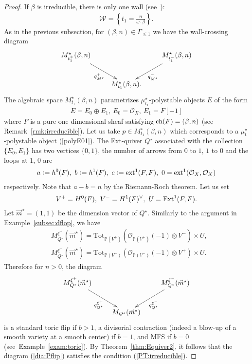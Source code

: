 \documentclass[11pt]{amsart}
\theoremstyle{plain}
\theoremstyle{definition}
\theoremstyle{remark}
\newcommand{\oO}{\mathcal{O}}
\newcommand{\wW}{\mathcal{W}}
\newcommand{\ch}{\mathop{\rm ch}\nolimits}
\newcommand{\Ext}{\mathop{\rm Ext}\nolimits}
\newcommand{\ext}{\mathop{\rm ext}\nolimits}
\begin{document}
\begin{proof}
If $\beta$ is irreducible, 
there is only one wall (see~\cite[Subsection~5.1]{Tolim}):
\begin{align*}
\wW=\left\{ t_1=\frac{n}{\omega \cdot \beta} \right\}.
\end{align*}
As in the previous subsection, 
for $(\beta, n) \in \Gamma_{\le 1}$ we have the wall-crossing 
diagram
\begin{align}\label{dia:Pflip}
\xymatrix{
M_{t_{1}^+}^{\star}(\beta, n) \ar[rd]_-{q_{M^{\star}}^{+}}
 & & M_{t_{1}^-}^{\star}(\beta, n) 
\ar[ld]^-{q_{M^{\star}}^{-}} \\
& M_{t_1}^{\star}(\beta, n). &
}
\end{align}
The algebraic space
$M_{t_1}^{\star}(\beta, n)$
 parametrizes $\mu_{t_1}^{\star}$-polystable 
objects $E$ of the form
\begin{align}\label{polyE01}
E=E_0  \oplus E_1, \ 
E_0=\oO_X, \ E_1=F[-1]
\end{align}
where $F$ is a pure one dimensional 
sheaf satisfying $\ch(F)=(\beta, n)$
(see Remark~\ref{rmk:irreducible}). 
Let us take 
$p \in M_{t_1}^{\star}(\beta, n)$ 
which 
corresponds to a $\mu_t^{\star}$-polystable object (\ref{polyE01}). 
The Ext-quiver $Q^{\star}$ associated with the collection 
$\{E_0, E_1\}$
has two vertices $\{0, 1\}$, 
the number of arrows from $0$ to $1$, $1$ to $0$ and 
the loops at $1$, $0$ are
\begin{align*}
a \cneq h^0(F), \ b \cneq h^1(F), \ c \cneq 
\ext^1(F, F), \ 0=\ext^1(\oO_X, \oO_X)
\end{align*}
respectively. 
Note that $a-b=n$
by the Riemann-Roch theorem. 
Let us set 
\begin{align*}
V^+=H^0(F), \ 
V^-=H^1(F)^{\vee}, \ U=\Ext^1(F, F).
\end{align*}
Let $\vec{m}^{\star}=(1, 1)$ be the dimension vector of 
$Q^{\star}$.  
Similarly to the argument in Example~\ref{subsec:dflop}, 
we have
\begin{align*}
&M_{Q^{\star}}^{\xi^+}(\vec{m}^{\star})=
\mathrm{Tot}_{\mathbb{P}(V^+)}
(\oO_{\mathbb{P}(V^+)}(-1) \otimes
V^-) \times U, \\
&M_{Q^{\star}}^{\xi^-}(\vec{m}^{\star})=
\mathrm{Tot}_{\mathbb{P}(V^-)}
(\oO_{\mathbb{P}(V^-)}(-1) \otimes
V^+) \times U.
\end{align*}
Therefore for $n>0$, the diagram
\begin{align}\notag
\xymatrix{
M_{Q^{\star}}^{\xi^{+}}(\vec{m}^{\star})
 \ar[rd]_-{q_{Q^{\star}}^{\xi^{+}}}
 & & M_{Q^{\star}}^{\xi^{-}}(\vec{m}^{\star}) 
\ar[ld]^-{q_{Q^{\star}}^{\xi^{-}}} \\
& M_{Q^{\star}}(\vec{m}^{\star}) &
} 
\end{align}
is a standard toric flip if $b>1$, 
a divisorial contraction (indeed a blow-up of 
a smooth variety at a smooth center) if $b=1$, 
and 
MFS if $b=0$
(see~Example~\ref{exam:toric}). 
By Theorem~\ref{thm:Equiver2}, 
it follows that 
the diagram (\ref{dia:Pflip})
satisfies the condition (\ref{PT:irreducible}). 


\end{proof}
\end{document}
